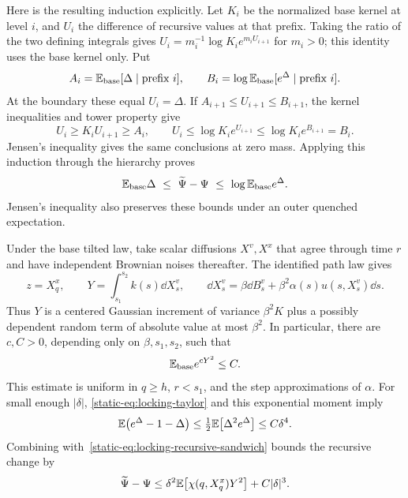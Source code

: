 Here is the resulting induction explicitly. Let $K_i$ be the
normalized base kernel at level $i$, and $U_i$ the difference of
recursive values at that prefix. Taking the ratio of the two defining
integrals gives $U_i=m_i^{-1}\log K_i e^{m_iU_{i+1}}$ for $m_i>0$;
this identity uses the base kernel only. Put
\[
 A_i=\mathbb E_{\rm base}[\Delta\mid\text{prefix }i],\qquad
 B_i=\log\mathbb E_{\rm base}[e^\Delta\mid\text{prefix }i].
\]
At the boundary these equal $U_i=\Delta$. If
$A_{i+1}\leq U_{i+1}\leq B_{i+1}$, the kernel inequalities and tower
property give
\[
 U_i\geq K_iU_{i+1}\geq A_i,\qquad
 U_i\leq\log K_ie^{U_{i+1}}
       \leq\log K_ie^{B_{i+1}}=B_i.
\]
Jensen's inequality gives the same conclusions at zero mass. Applying
this induction through the hierarchy proves
\begin{equation}
\label{static-eq:locking-recursive-sandwich}
 \mathbb E_{\rm base}\Delta
 \ \leq\ \widetilde\Psi-\Psi
 \ \leq\ \log\mathbb E_{\rm base}e^\Delta.
\end{equation}
Jensen's inequality also preserves these bounds under an outer
quenched expectation.

Under the base tilted law, take scalar diffusions $X^v,X^x$ that agree
through time $r$ and have independent Brownian noises thereafter.
The identified path law gives
\[
 z=X_q^x,\qquad
 Y=\int_{s_1}^{s_2} k(s)\dd X_s^v,
 \qquad
 \dd X_s^v=\beta\dd B_s^v
          +\beta^2\alpha(s)u(s,X_s^v)\dd s.
\]
Thus $Y$ is a centered Gaussian increment of variance $\beta^2K$
plus a possibly dependent random term of absolute value at most
$\beta^2$. In particular, there are $c,C>0$, depending only on
$\beta,s_1,s_2$, such that
\begin{equation}
\label{static-eq:locking-Y-moment}
 \mathbb E_{\rm base}e^{cY^2}\leq C.
\end{equation}
This estimate is uniform in $q\geq h$, $r<s_1$, and the step
approximations of $\alpha$. For small enough $|\delta|$,
\eqref{static-eq:locking-taylor} and this exponential moment imply
\[
 \mathbb E\bigl(e^\Delta-1-\Delta\bigr)
 \leq\tfrac12\mathbb E\bigl[\Delta^2e^\Delta\bigr]
 \leq C\delta^4.
\]
Combining with~\eqref{static-eq:locking-recursive-sandwich} bounds the
recursive change by
\begin{equation}
\label{static-eq:locking-recursive-expansion}
 \widetilde\Psi-\Psi
 \leq\delta^2\mathbb E\bigl[\chi(q,X_q^x)Y^2\bigr]+C|\delta|^3.
\end{equation}

